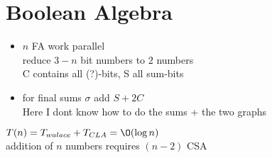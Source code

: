 \section{Boolean Algebra}
\begin{itemize}
    \item $n$ FA work parallel \\
    reduce $3-n$ bit numbers to $2$ numbers \\
    C contains all (?)-bits, S all sum-bits
    \item for final sums $\sigma$ add $S+2C$ \\
    Here I dont know how to do the sums + the two graphs
\end{itemize} \smallskip

$T(n)=T_{walace}+T_{CLA}=\O(\log n)$ \\
addition of $n$ numbers requires $(n-2)$ CSA

